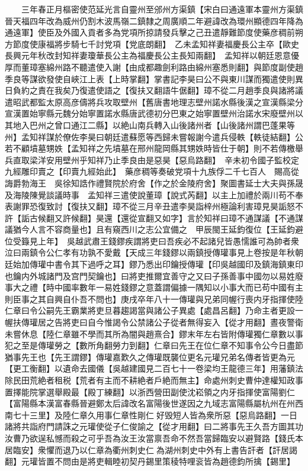 　　三年春正月樞密使范延光言自靈州至邠州方渠鎮【宋白曰通遠軍本靈州方渠鎮晉天福四年改為威州仍割木波馬嶺二鎮隸之周廣順二年避諱改為環州顯德四年降為通遠軍】使臣及外國入貢者多為党項所掠請發兵擊之己丑遣靜難節度使藥彦稠前朔方節度使康福將步騎七千討党項【党底朗翻】　乙未孟知祥妻福慶長公主卒【歐史長興元年秋改封知祥妻瓊華長公主為福慶長公主長知兩翻】　孟知祥以朝廷恩意優厚而董璋塞綿州路不聽遣使入謝【由成都趣劍利路由綿州塞悉則翻】與節度副使趙季良等謀欲發使自峽江上表【上時掌翻】掌書記李昊曰公不與東川謀而獨遣使則異日負約之責在我矣乃復遣使語之【復扶又翻語牛倨翻】璋不從二月趙季良與諸將議遣昭武都監太原高彦儔將兵攻取壁州【舊唐書地理志壁州諾水縣後漢之宣漢縣梁分宣漢置始寧縣元魏分始寧置諾水縣唐武德初分巴東之始寧置壁州治諾水宋廢壁州以其地入巴州之曾口通江二縣】以絶山南兵轉入山後諸州者【山後諸州謂巴蓬果等州】孟知祥謀於僚佐李昊曰朝廷遣蘇愿等西歸未嘗報謝今遣兵侵軼【軼徒結翻】公若不顧墳墓甥妷【孟知祥之先墳墓在邢州龍岡縣其甥妷時皆仕于朝】則不若傳檄舉兵直取梁洋安用壁州乎知祥乃止季良由是惡昊【惡烏路翻】　辛未初令國子監校定九經雕印賣之【印賣九經始此】　藥彦稠等奏破党項十九族俘二千七百人　賜高從誨爵勃海王　吳徐知誥作禮賢院於府舍【作之於金陵府舍】聚圖書延士大夫與孫晟及海陵陳覺談議時事　孟知祥三遣使說董璋【說式芮翻】以主上加禮於兩川苟不奉表謝罪恐復致討【復扶又翻】璋不從三月辛丑遣李昊詣梓州極論利害璋見昊詬怒不許【詬古候翻又許候翻】昊還【還從宣翻又如字】言於知祥曰璋不通謀議【不通謀議猶今人言不容商量也】且有窺西川之志公宜備之　甲辰閩王延鈞復位【王延鈞避位受籙見上年】　吳越武肅王錢鏐疾謂將吏曰吾疾必不起諸兒皆愚懦誰可為帥者衆泣曰兩鎮令公仁孝有功孰不愛戴【天成三年錢鏐以兩鎮授傳瓘事見上卷按是年秋朝廷始加傳瓘中書令其下過呼之耳】鏐乃悉出印鑰授傳瓘【印吳越國印及鎮海鎮東印也鑰内外城諸門及宫門契鑰也】曰將吏推爾宜善守之又曰子孫善事中國勿以易姓廢事大之禮【時中國率數年一易姓錢鏐之意蓋謂偏據一隅知以小事大而已苟中國有主則臣事之其自興自仆吾不問也】庚戌卒年八十一傳瓘與兄弟同幄行喪内牙指揮使陸仁章曰令公嗣先王霸業將吏旦暮趨謁當與諸公子異處【處昌呂翻】乃命主者更設一幄扶傳瓘居之告將吏曰自今惟謁令公禁諸公子從者無得妄入【從才用翻】晝夜警衛未嘗休息【陸仁章雖不學而其所為闇與趙熹合】鏐末年左右皆附傳瓘獨仁章數以事犯之至是傳瓘勞之【數所角翻勞力到翻】仁章曰先王在位仁章不知事令公今日盡節猶事先王也【先王謂鏐】傳瓘嘉歎久之傳瓘既襲位更名元瓘兄弟名傳者皆更為元【更工衡翻】以遺命去國儀【吳越建國見二百七十一卷梁均王龍德三年】用藩鎮法除民田荒絶者租税【荒者有主而不耕絶者戶絶而無主】命處州刺史曹仲達權知政事置擇能院掌選舉殿最【殿丁練翻】以浙西營田副使沈崧領之内牙指揮使富陽劉仁【富陽縣本漢富春縣晉避鄭太后諱改名富陽後世遂因之九域志富陽縣屬杭州在州西南七十三里】及陸仁章久用事仁章性剛仁好毁短人皆為衆所惡【惡烏路翻】一日諸將共詣府門請誅之元瓘使從子仁俊諭之【從才用翻】曰二將事先王久吾方圖其功汝曹乃欲逞私憾而殺之可乎吾為汝王汝當禀吾命不然吾當歸臨安以避賢路【錢氏本居臨安】衆懼而退乃以仁章為衢州刺史仁為湖州刺史中外有上書告訐者【訐居謁翻】元瓘皆置不問由是將吏輯睦初契丹錫里策稜特哩衮皆為趙德鈞所擒【錫里】

